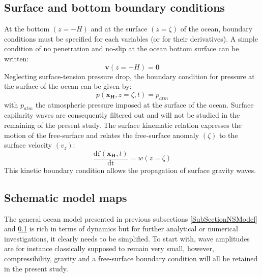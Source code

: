 \documentclass[a4paper,11pt]{article}
\begin{document}
\subsection{Surface and bottom boundary conditions}
\label{SubSectionBC}
At the bottom $(z=-H)$ and at the surface $(z=\zeta)$ of the ocean, boundary conditions must be specified for each variables (or for their derivatives). A simple condition of no penetration and no-slip at the ocean bottom surface can be written:
\begin{equation}
 \displaystyle
 \label{NS_BC0}
  \mathbf{v}(z=-H)=\mathbf{0}
\end{equation}
Neglecting surface-tension pressure drop, the boundary condition for pressure at the surface of the ocean can be given by:
\begin{equation}
 \displaystyle
 \label{NS_BC1}
  p(\mathbf{x_{\scriptscriptstyle H}},z=\zeta,t)= p_{atm}
\end{equation}
with $p_{atm}$ the atmospheric pressure imposed at the surface of the ocean. Surface capilarity waves are consequently filtered out and will not be studied in the remaining of the present study. The surface kinematic relation expresses the motion of the free-surface and relates the free-surface anomaly $(\zeta)$ to the surface velocity $(v_z)$:
\begin{equation}
  \displaystyle
  \label{NS_BC2}
  \frac{\textrm{d}\zeta(\mathbf{x_{\scriptscriptstyle H}},t)}{\textrm{dt}}=w(z=\zeta)
\end{equation}
This kinetic boundary condition allows the propagation of surface gravity waves.

\subsection{Schematic model maps}
\label{SubSectionMaps}


The general ocean model presented in previous subsections \ref{SubSectionNSModel} and \ref{SubSectionBC} is rich in terms of dynamics but for further analytical or numerical investigations, it clearly needs to be simplified. To start with, wave amplitudes are for instance classically supposed to remain very small, however, compressibility, gravity and a free-surface boundary condition will all be retained in the present study.\\
\end{document}

